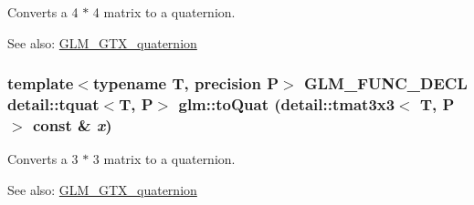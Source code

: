 Converts a 4 $\ast$ 4 matrix to a quaternion.

\begin{Desc}
\item[See also:]\hyperlink{group__gtx__quaternion}{GLM\_\-GTX\_\-quaternion} \end{Desc}
\hypertarget{group__gtx__quaternion_gdc8d8daae2f8d725dae576d6655e36d2}{
\subsubsection[toQuat]{\setlength{\rightskip}{0pt plus 5cm}template$<$typename T, precision P$>$ GLM\_\-FUNC\_\-DECL detail::tquat$<$T, P$>$ glm::toQuat (detail::tmat3x3$<$ T, P $>$ const \& {\em x})}}
\label{group__gtx__quaternion_gdc8d8daae2f8d725dae576d6655e36d2}


Converts a 3 $\ast$ 3 matrix to a quaternion.

\begin{Desc}
\item[See also:]\hyperlink{group__gtx__quaternion}{GLM\_\-GTX\_\-quaternion} \end{Desc}
